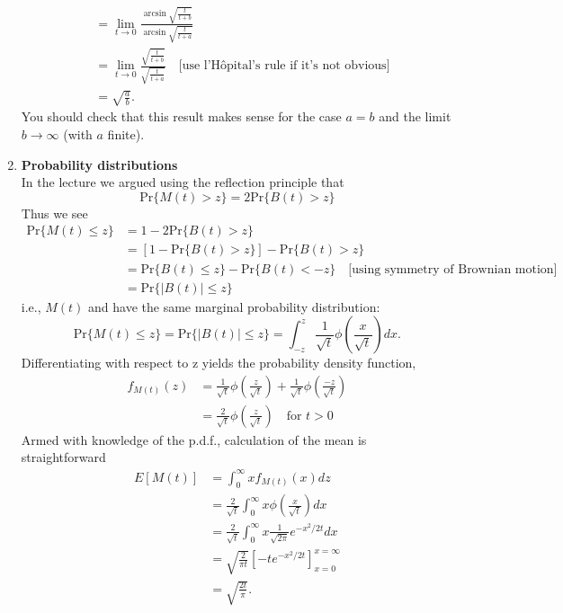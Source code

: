 \documentclass[11pt,a4paper]{article}
\begin{document}
\begin{enumerate}
\begin{align*}
      &= \lim_{t\to 0}\frac{\arcsin\sqrt{\frac{t}{t + b}}}{\arcsin\sqrt{\frac{t}{t + a}}}\\
      &= \lim_{t\to 0}\frac{\sqrt{\frac{t}{t + b}}}{\sqrt{\frac{t}{t + a}}}\quad\text{[use l'H\^{o}pital's rule if it's not obvious]}\\
      &= \sqrt{\frac{a}{b}}.
    \end{align*}
    You should check that this result makes sense for the case $a = b$ and the limit $b \to \infty$ (with $a$ finite).
    \item \textbf{Probability distributions}\\
    In the lecture we argued using the reflection principle that
    $$
    \text{Pr}\{M(t) > z\} = 2\text{Pr}\{B(t) > z\}
    $$
    Thus we see
    \begin{align*}
      \text{Pr}\{M(t) \leq z\}
      &= 1 - 2\text{Pr}\{B(t) > z\}\\
      &= [1 - \text{Pr}\{B(t) > z\}] - \text{Pr}\{B(t) > z\}\\
      &= \text{Pr}\{B(t) \leq z\} - \text{Pr}\{B(t) < -z\}\quad\text{[using symmetry of Brownian motion]}\\
      &= \text{Pr}\{|B(t)| \leq z\}
    \end{align*}
    i.e., $M(t)$ and have the same marginal probability distribution:
    $$
    \text{Pr}\{M(t) \leq z\} = \text{Pr}\{|B(t)| \leq z\} = \int_{-z}^z\frac{1}{\sqrt{t}}\phi\left(\frac{x}{\sqrt{t}}\right)dx.
    $$
    Differentiating with respect to z yields the probability density function,
    \begin{align*}
      f_{M(t)}(z)
      &= \frac{1}{\sqrt{t}}\phi\left(\frac{z}{\sqrt{t}}\right) + \frac{1}{\sqrt{t}}\phi\left(\frac{-z}{\sqrt{t}}\right)\\
      &= \frac{2}{\sqrt{t}}\phi\left(\frac{z}{\sqrt{t}}\right)\quad\text{for $t > 0$}
    \end{align*}
    Armed with knowledge of the p.d.f., calculation of the mean is straightforward
    \begin{align*}
      E[M(t)]
      &= \int_0^\infty xf_{M(t)}(x)dz\\
      &= \frac{2}{\sqrt{t}}\int_0^\infty x\phi\left(\frac{x}{\sqrt{t}}\right)dx\\
      &= \frac{2}{\sqrt{t}}\int_0^\infty x\frac{1}{\sqrt{2\pi}}e^{-x^2/2t}dx\\
      &= \sqrt{\frac{2}{\pi t}}\left[-te^{-x^2/2t}\right]_{x = 0}^{x = \infty}\\
      &= \sqrt{\frac{2t}{\pi}}.

\end{align*}
\end{enumerate}
\end{document}
